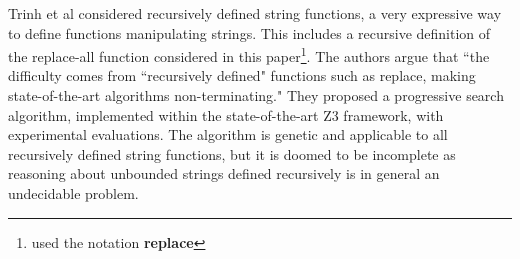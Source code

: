


%



\cite{TCJ16} 
Trinh et al considered %
recursively defined string functions, a very expressive way to define functions manipulating strings. This includes a recursive definition of the replace-all function considered in this paper\footnote{\cite{TCJ16} used the notation \textbf{replace}}. The authors argue that ``the difficulty comes from ``recursively defined" functions such as replace, making state-of-the-art algorithms non-terminating." They proposed a progressive search algorithm, %
implemented within the state-of-the-art Z3 framework, with experimental evaluations. The algorithm is genetic and  applicable to all recursively defined string functions, but it is doomed to be incomplete as reasoning about unbounded strings defined recursively is in general an undecidable problem.   



